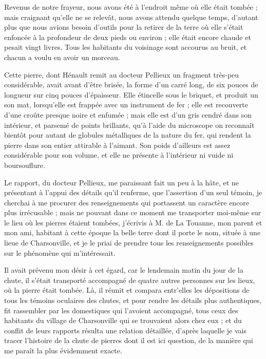 \documentclass[a4paper, 12pt, oneside, french]{article}
\begin{document}
\og Revenus de notre frayeur, nous avons été à l'endroit même où elle était tombée ; mais craignant qu'elle ne se relevât, nous avons attendu quelque temps, d'autant plus que nous avions besoin d'outils pour la retirer de la terre où elle s'était enfoncée à la profondeur de deux pieds ou environ ; elle était encore chaude et pesait vingt livres. Tous les habitants du voisinage sont accourus au bruit, et chacun a voulu en avoir un morceau. \fg

Cette pierre, dont Hénault remit au docteur Pellieux un fragment très-peu considérable, avait avant d'être brisée, la forme d'un carré long, de six pouces de longueur sur cinq pouces d'épaisseur. Elle étincelle sous le briquet, et produit un son mat, lorsqu'elle est frappée avec un instrument de fer ; elle est recouverte d'une croûte presque noire et enfumée ; mais elle est d'un gris cendré dans son intérieur, et parsemé de points brillants, qu'à l'aide du microscope on reconnaît bientôt pour autant de globules métalliques de la nature du fer, qui rendent la pierre dans son entier attirable à l'aimant. Son poids d'ailleurs est assez considérable pour son volume, et elle ne présente à l'intérieur ni vuide ni boursouflure.

Le rapport, du docteur Pellieux, me paraissant fait un peu à la hâte, et ne présentant à l'appui des détails qu'il renferme, que l'assertion d'un seul témoin, je cherchai à me procurer des renseignements qui portassent un caractère encore plus irrécusable ; mais ne pouvant dans ce moment me transporter moi-même sur le lieu où les pierres étaient tombées, j'écrivis à M. de La Touanne, mon parent et mon ami, habitant à cette époque la belle terre dont il porte le nom, située à une lieue de Charsonville, et je le priai de prendre tous les renseignements possibles sur le phénomène qui m'intéressait.

Il avait prévenu mon désir à cet égard, car le lendemain matin du jour de la chute, il s'était transporté accompagné de quatre autres personnes sur les lieux, où la pierre était tombée. Là, il réunit et compara entr'elles les dépositions de tous les témoins oculaires des chutes, et pour rendre les détails plus authentiques, fit rassembler par les domestiques qui l'avoient accompagné, tous ceux des habitants du village de Charsonville qui se trouvaient alors chez eux ; et du conflit de leurs rapports résulta une relation détaillée, d'après laquelle je vais tracer l'histoire de la chute de pierres dont il est ici question, de la manière qui me paraît la plus évidemment exacte.
\end{document}
